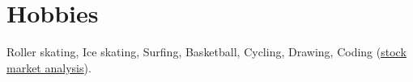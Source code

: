 \documentclass[10pt,a4paper]{article}
\newcommand{\link}[2]{\href{#1}{\textcolor{linkblue}{\uline{#2}}}}
\begin{document}
\section{Hobbies}
Roller skating, Ice skating, Surfing, Basketball, Cycling, Drawing, Coding
(\link{https://shaakon35.github.io/Stock_portfolio/}{stock market analysis}).
\end{document}
